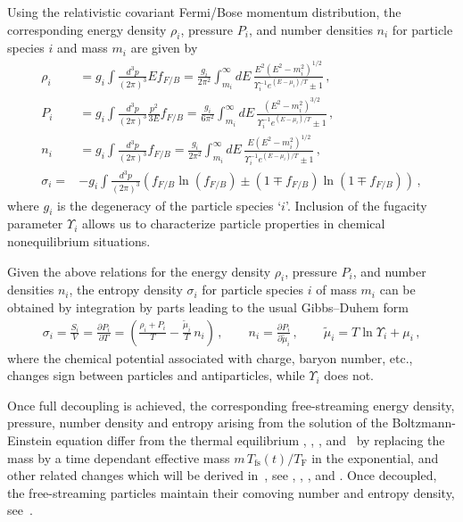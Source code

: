 Using the relativistic covariant Fermi/Bose momentum distribution, the corresponding energy density $\rho_i$, pressure $P_i$, and number densities $n_i$ for particle species $i$ and mass $m_i$ are given by
\begin{align}
\rho_i&=g_i\int\!\!\frac{d^3p}{(2\pi)^3}Ef_{F/B}=\frac{g_i}{2\pi^2}\!\int_{m_i}^\infty\!\!\!dE\,\frac{E^2\left(E^2-m_i^2\right)^{1/2}}{\Upsilon_i^{-1}e^{(E-\mu_i)/T}\pm 1}\,,
\label{energy_density}\\[0.2cm]
P_i&=g_i\int\!\!\frac{d^3p}{(2\pi)^3}\frac{p^2}{3E}f_{F/B}=\frac{g_i}{6\pi^2}\!\int_{m_i}^\infty\!\!\!dE\,\frac{\left(E^2-m_i^2\right)^{3/2}}{\Upsilon_i^{-1} e^{(E-\mu_i)/T}\pm 1}\,,
\label{Pressure_density}\\[0.2cm]
n_i&=g_i\int\!\!\frac{d^3p}{(2\pi)^3}f_{F/B}=\frac{g_i}{2\pi^2}\!\int_{m_i}^\infty\!\!\!dE\,\frac{E(E^2-m_i^2)^{1/2} }{\Upsilon_i^{-1}e^{(E-\mu_i)/T}\pm 1}\,,
\label{number_density}\\[0.2cm]
\sigma_i=&-g_i\int\!\! \frac{d^3p }{(2\pi)^3}(f_{F/B}\ln(f_{F/B})\pm(1\mp f_{F/B})\ln(1\mp f_{F/B}))
\,,
\end{align}
where $g_i$ is the degeneracy of the particle species `$i$'. Inclusion of the fugacity parameter $\Upsilon_i$ allows us to characterize particle properties in chemical nonequilibrium situations. 

{\color{black}Given the above relations for the energy density $\rho_i$, pressure $P_i$, and number densities $n_i$, the entropy density $\sigma_i$\label{entropy_density} for particle species $i$ of mass $m_i$ can be obtained by integration by parts leading to the usual Gibbs–Duhem form}
\begin{align}\label{entropy}
\sigma_i=\frac{S_i}{V}=\frac{\partial P_i}{\partial T}=\left(\frac{\rho_i+P_i}{T}-\frac{\tilde \mu_i}{T}\,n_i\right)\,,\qquad
n_i=\frac{\partial P_i}{\partial \tilde{\mu}_i}\,,\qquad
\tilde \mu_i=T\ln \Upsilon_i +\mu_i\,,
\end{align}
where the chemical potential associated with charge, baryon number, etc., changes sign between particles and antiparticles, while $\Upsilon_i$ does not.

Once full decoupling is achieved, the corresponding free-streaming energy density, pressure, number density and entropy arising from the solution of the Boltzmann-Einstein equation differ from the thermal equilibrium , , , and~ by replacing the mass by a time dependant effective mass $m\,T_\mathrm{fs}(t)/T_\mathrm{F}$ in the exponential, and other related changes which will be derived in~, see , , , and . Once decoupled, the free-streaming particles maintain their comoving number and entropy density, see~.

